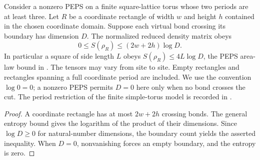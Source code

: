 \begin{lemma}%
    \label{thm:peps_torus_entanglement_bound}
    \leanok
    Consider a nonzero PEPS on a finite square-lattice torus whose two
    periods are at least three. Let $R$ be a coordinate rectangle of
    width $w$ and height $h$ contained in the chosen coordinate domain.
    Suppose each virtual bond crossing its boundary has dimension $D$.
    The normalized reduced density matrix obeys
    \[
        0\le S(\rho_R)\le (2w+2h)\log D.
    \]
    In particular a square of side length $L$ obeys
    $S(\rho_R)\le4L\log D$, the PEPS area-law bound in
    \cite[Section II.A.3]{Cirac2021Matrix}. The tensors may vary from site
    to site. Empty rectangles and rectangles spanning a full coordinate
    period are included. We use the convention $\log0=0$;
    a nonzero PEPS permits $D=0$ here only when no bond crosses
    the cut.
    The period restriction of the finite simple-torus model is recorded in
    \cite{gap:rmp_peps_quantum_double_g_isometry}.
\end{lemma}

\begin{proof}\leanok
    A coordinate rectangle has at most $2w+2h$ crossing bonds.
    The general entropy bound gives the logarithm of the product of
    their dimensions. Since $\log D\ge0$ for natural-number dimensions,
    the boundary count yields the asserted inequality. When $D=0$,
    nonvanishing forces an empty boundary, and the entropy is zero.
\end{proof}
